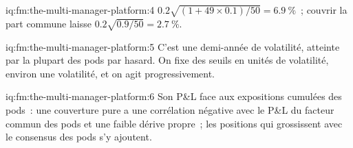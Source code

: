 \begin{solution}{iq:fm:the-multi-manager-platform:4}
$0.2\sqrt{(1+49\times0.1)/50}=6.9~\%$~; couvrir la part commune laisse $0.2\sqrt{0.9/50}=2.7~\%$.
\end{solution}

\begin{solution}{iq:fm:the-multi-manager-platform:5}
C'est une demi-année de volatilité, atteinte par la plupart des pods par hasard. On fixe des seuils en unités de volatilité, environ une volatilité, et on agit progressivement.
\end{solution}

\begin{solution}{iq:fm:the-multi-manager-platform:6}
Son P\&L face aux expositions cumulées des pods~: une couverture pure a une corrélation négative avec le P\&L du facteur commun des pods
et une faible dérive propre~; les positions qui grossissent avec le consensus des pods s'y ajoutent.
\end{solution}

